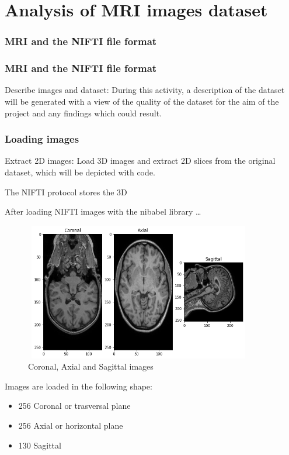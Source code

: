 \section{Analysis of MRI images dataset}
\subsubsection*{MRI and the NIFTI file format}
\subsubsection*{MRI and the NIFTI file format}
Describe images and dataset: During this activity, a description of the dataset will be generated with a view of the quality of the dataset for the aim of the project and any findings which could result.
\subsubsection*{Loading images}
Extract 2D images: Load 3D images and extract 2D slices from the original dataset, which will be depicted with code.

The NIFTI protocol stores the 3D 

After loading NIFTI images with the nibabel library \dots

\begin{figure}[ht]
    \centering
    \includegraphics[width = 10cm, height = 6cm]{images/3-axis.png}
    \caption[]{Coronal, Axial and Sagittal images}
    \label{fig:3-axis}
\end{figure}

Images are loaded in the following shape:

\begin{itemize}
    \item 256 Coronal or trasversal plane 
    \item 256 Axial or horizontal plane
    \item 130 Sagittal
\end{itemize}


